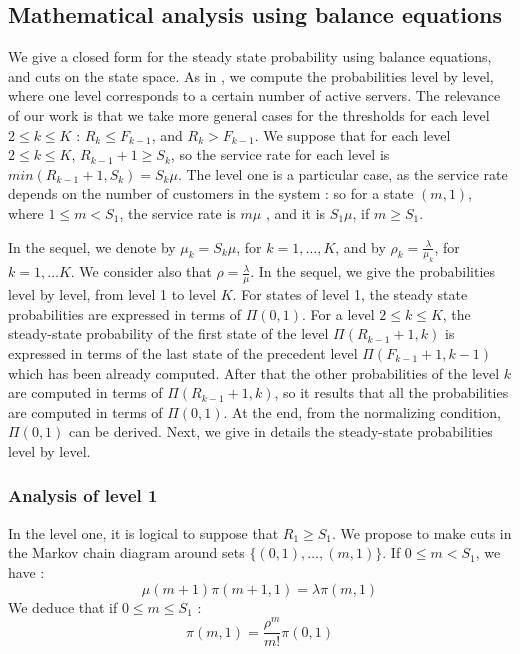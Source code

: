 \documentclass[conference]{IEEEtran}
\begin{document}
\subsection{Mathematical analysis using balance equations} %
We give a closed form for the steady state probability using balance equations, and cuts on the state space. As 
in \cite{le2000simple}, we compute the probabilities level by level,
where one level corresponds to a certain number of  active servers. The relevance of our work is that we take more general cases for the thresholds  for each level $2 \leq k \leq K$ : $R_{k} \leq F_{k-1}$, and  $R_{k} > F_{k-1}$.
We suppose that for each level $2 \leq k \leq K$, $R_{k-1}+1 \geq S_k$, so the service rate for each level is 
$min(R_{k-1}+1, S_k)=S_k \mu$. The level one is a particular case, as the service rate depends on the number 
of customers in the system : so for a state $(m,1)$, where $1 \leq m < S_1$, the service rate is $m \mu$ , and it is 
$S_1 \mu$, if $m \geq S_1$.  

In the sequel, we denote by  $\mu_k=S_k \mu$, for $k=1, \ldots, K$,  and by $\rho_k = \frac{\lambda}{\mu_k}$, for $k=1,\ldots K$. We consider also that $\rho = \frac{\lambda} {\mu}$. In the sequel, we give the probabilities level by level, from level 1 to level $K$.
For states of level 1,  the steady state probabilities  are expressed in terms of $\Pi(0,1)$. For a level $2 \leq k \leq K$,  the steady-state probability of the  first state of the level $\Pi(R_{k-1}+1,k)$ is expressed in terms of the last state 
of the precedent level $\Pi(F_{k-1}+1,k-1)$ which has been already computed. After that the other probabilities of the level $k$ are computed in terms of $\Pi(R_{k-1}+1,k)$, so it results that all the probabilities  are computed in terms of 
$\Pi(0,1)$. At the end, from the normalizing condition, $\Pi(0,1)$ can be derived. Next, we give in details 
the steady-state probabilities level by level. 

\subsubsection{Analysis of level 1}
In the level one, it is logical to suppose that $R_1 \geq S_1$. 
We propose to make cuts  in the Markov chain diagram around sets 
$\{(0,1), \ldots, (m,1)\}$. If $0 \leq m <S_1$, we have :
\begin{equation}
 \mu(m+1) \pi(m+1,1)= \lambda \pi(m,1)\label{eq1}
 \end{equation}
\noindent We   deduce that if $0\leq m \leq S_1$ :
 \begin{equation}
 \pi(m,1)=\frac{\rho^{m}}{m!} \pi(0,1)
 \label{eq1a}
 \end{equation}
\end{document}
